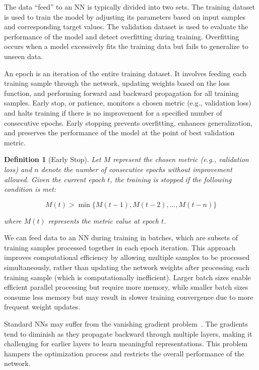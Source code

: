 \documentclass[ppgc,diss,english]{iiufrgs}
\newtheorem{definition}{Definition}
\begin{document}
The data ``feed'' to an NN is typically divided into two sets. The training dataset is used to train the model by adjusting its parameters based on input samples and corresponding target values. The validation dataset is used to evaluate the performance of the model and detect overfitting during training. Overfitting occurs when a model excessively fits the training data but fails to generalize to unseen data.

An epoch is an iteration of the entire training dataset. It involves feeding each training sample through the network, updating weights based on the loss function, and performing forward and backward propagation for all training samples.
Early stop, or patience, monitors a chosen metric (e.g., validation loss) and halts training if there is no improvement for a specified number of consecutive epochs. Early stopping prevents overfitting, enhances generalization, and preserves the performance of the model at the point of best validation metric.

\begin{definition}[Early Stop]
Let $M$ represent the chosen metric (e.g., validation loss) and $n$ denote the number of consecutive epochs without improvement allowed. Given the current epoch $t$, the training is stopped if the following condition is met:

$$M(t) > \min\{M(t-1), M(t-2), \ldots, M(t-n)\}$$

where $M(t)$ represents the metric value at epoch $t$.
\end{definition}

We can feed data to an NN during training in batches, which are subsets of training samples processed together in each epoch iteration.
This approach improves computational efficiency by allowing multiple samples to be processed simultaneously, rather than updating the network weights after processing each training sample (which is computationally inefficient).
Larger batch sizes enable efficient parallel processing but require more memory, while smaller batch sizes consume less memory but may result in slower training convergence due to more frequent weight updates.

Standard NNs may suffer from the vanishing gradient problem~\cite{Hochreiter/1991}. The gradients tend to diminish as they propagate backward through multiple layers, making it challenging for earlier layers to learn meaningful representations. This problem hampers the optimization process and restricts the overall performance of the network.
\end{document}
